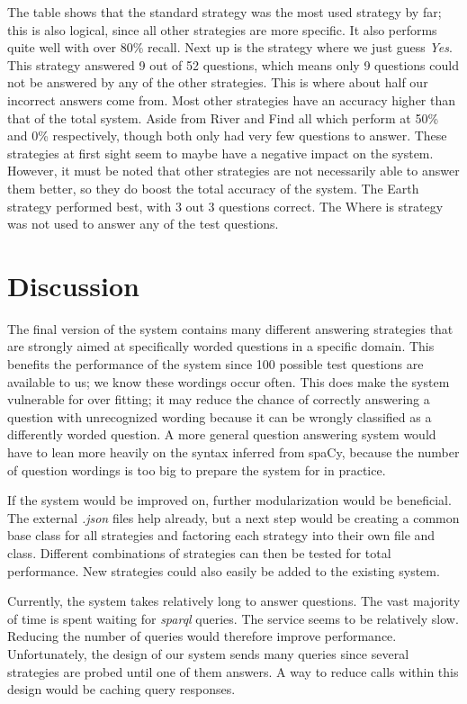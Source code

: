 \documentclass{article}
\begin{document}
The table shows that the standard strategy was the most used strategy by far; this is also logical, since all other strategies are more specific. It also performs quite well with over 80\% recall. Next up is the strategy where we just guess \textit{Yes}. This strategy answered 9 out of 52 questions, which means only 9 questions could not be answered by any of the other strategies. This is where about half our incorrect answers come from. Most other strategies have an accuracy higher than that of the total system. Aside from River and Find all which perform at 50\% and 0\% respectively, though both only had very few questions to answer. These strategies at first sight seem to maybe have a negative impact on the system. However, it must be noted that other strategies are not necessarily able to answer them better, so they do boost the total accuracy of the system. The Earth strategy performed best, with 3 out 3 questions correct. The Where is strategy was not used to answer any of the test questions.

\section{Discussion}
The final version of the system contains many different answering strategies that are strongly aimed at specifically worded questions in a specific domain. This benefits the performance of the system since 100 possible test questions are available to us; we know these wordings occur often. This does make the system vulnerable for over fitting; it may reduce the chance of correctly answering a question with unrecognized wording because it can be wrongly classified as a differently worded question. A more general question answering system would have to lean more heavily on the syntax inferred from spaCy, because the number of question wordings is too big to prepare the system for in practice.

If the system would be improved on, further modularization would be beneficial. The external \emph{.json} files help already, but a next step would be creating a common base class for all strategies and factoring each strategy into their own file and class. Different combinations of strategies can then be tested for total performance. New strategies could also easily be added to the existing system.

Currently, the system takes relatively long to answer questions. The vast majority of time is spent waiting for \emph{sparql} queries. The service seems to be relatively slow. Reducing the number of queries would therefore improve performance. Unfortunately, the design of our system sends many queries since several strategies are probed until one of them answers. A way to reduce calls within this design would be caching query responses.
\end{document}
